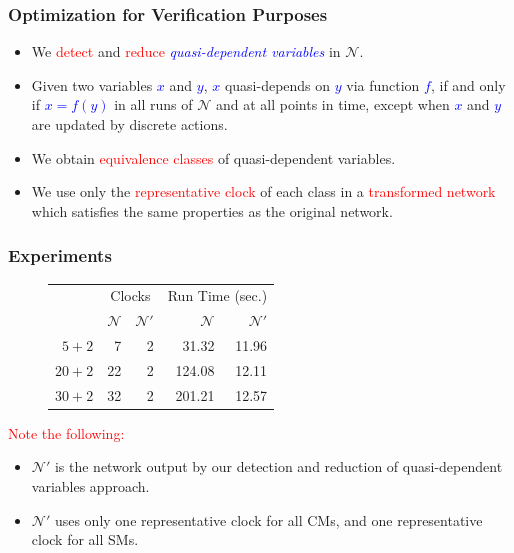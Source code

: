 \documentclass[serif]{beamer}
\begin{document}
\begin{frame}\frametitle{\textbf{Optimization for Verification Purposes}}
\begin{itemize}
	\item We \textcolor{red}{detect} and \textcolor{red}{reduce} 
				\emph{\textcolor{blue}{quasi-dependent variables}} in $\mathcal{N}$.
	\item Given two variables \textcolor{blue}{$x$} and \textcolor{blue}{$y$}, \textcolor{blue}{$x$} quasi-depends
on \textcolor{blue}{$y$} via function \textcolor{blue}{$f$}, if and only if \textcolor{blue}{$x=f(y)$} in all 
runs of $\mathcal{N}$ and at all points in time, except when \textcolor{blue}{$x$} and \textcolor{blue}{$y$} are updated by discrete actions.
	\item We obtain \textcolor{red}{equivalence classes} of quasi-dependent variables. 
	\item We use only the \textcolor{red}{representative clock} of each class in a 
				\textcolor{red}{transformed network} which satisfies the same properties as
				the original network.
\end{itemize}
\end{frame} 

\begin{frame}\frametitle{\textbf{Experiments}}
\begin{center}
\begin{figure} 
\begin{table}[t]%
  \centering
  \begin{tabular}[b]{|r||r|r||r|r|}
    \hline
    \multirow{2}{*}{} &
    \multicolumn{2}{|c||}{\scriptsize Clocks}  & 
    \multicolumn{2}{|c|}{\scriptsize Run Time (sec.)} 
    \\ 
    \scriptsize Components
    &\scriptsize $\mathcal{N}$ &\scriptsize $\mathcal{N}'$  
    &\scriptsize $\mathcal{N}$ &\scriptsize $\mathcal{N}'$ 
    \\    \hline\hline 
    \scriptsize $5 + 2$ & \scriptsize 7 & \scriptsize 2 &\scriptsize 31.32 
    &\scriptsize 11.96
    \\    \hline 
    \scriptsize $20 + 2$ & \scriptsize 22 & \scriptsize 2  &\scriptsize 124.08&\scriptsize 12.11
    \\    \hline 
    \scriptsize $30 + 2$ & \scriptsize 32 &\scriptsize 2 &\scriptsize 201.21 &\scriptsize 12.57
    \\    \hline 
  \end{tabular}
\end{table}%
\end{figure} 
\end{center}

\textcolor{red}{Note the following:} 
\begin{itemize}
	\item $\mathcal{N}'$ is the network output by our detection and reduction of quasi-dependent variables approach.
	\item $\mathcal{N}'$ uses only one representative clock for all CMs, and one representative clock for all SMs.
\end{itemize}  
\end{frame}
 
\end{document}
